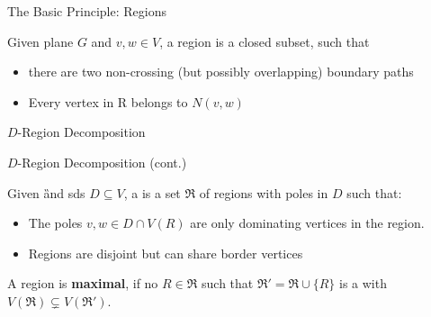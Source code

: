 \begin{frame}[c]{The Basic Principle: Regions}

    \begin{tcolorbox}[colback=TUMBlueLighter,title=Region (Simplified)]
        Given plane $G$ and $v,w \in V$, a region is a closed subset, such that
    \begin{itemize}
        \item there are two non-crossing (but possibly overlapping) boundary paths
        \item Every vertex in R belongs to $N(v,w)$
    \end{itemize}
    \end{tcolorbox}

    \begin{figure}[!ht]
    \end{figure}
\end{frame}

\begin{frame}[c]{$D$-Region Decomposition}
    \begin{figure}[!ht]
    \end{figure}
\end{frame}



\begin{frame}[c]{$D$-Region Decomposition (cont.)}
    \begin{tcolorbox}[colback=TUMBlueLighter,title={\dreg~(Alber, Fellows, Niedermeier \cite{Alber2004})}]
        Given \G and sds $D \subseteq V$, a \dreg is a set $\mathfrak{R}$ of regions with poles in $D$ such that:
        \begin{itemize}
            \item The poles $v,w \in D \cap V(R)$  are only dominating vertices in the region.
            \item Regions are disjoint but can share border vertices
        \end{itemize}
    \end{tcolorbox}
   \pause A region is \textbf{maximal}, if no $R \in \mathfrak{R}$ such that $\mathfrak{R}' = \mathfrak{R} \cup \{R\}$ is a \dreg with $V(\mathfrak{R})\subsetneq V(\mathfrak{R}')$.
    \begin{figure}[!ht]
    \end{figure}
\end{frame}

